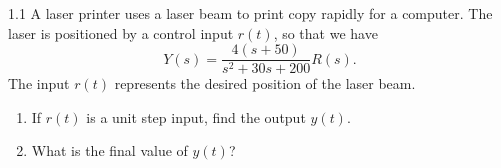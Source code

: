 
\begin{problem}{1.1}
  A laser printer uses a laser beam to print copy rapidly for a computer.
  The laser is positioned by a control input $r(t)$, so that we have
  \begin{equation*}
    Y(s) = \frac{4(s+50)}{s^2 + 30s + 200}R(s)
  .\end{equation*}
  The input $r(t)$ represents the desired position of the laser beam.
  \begin{enumerate}[label=(\alph*)]
    \item If $r(t)$ is a unit step input, find the output $y(t)$.
    \item What is the final value of $y(t)$?
  \end{enumerate}
\end{problem}

